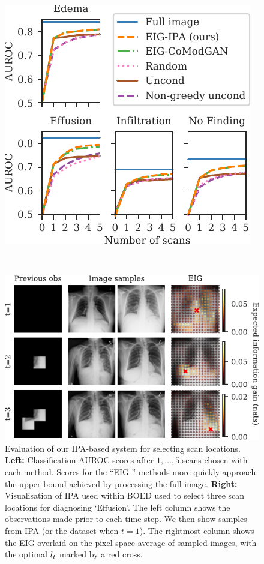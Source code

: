 \begin{figure}[t]
  \centering
  \hspace{-.75cm}
  \begin{minipage}{.4\textwidth}
    \centering
    \includegraphics[scale=.77]{figs/cigcvae/boed-auroc-curve-rearranged}
  \end{minipage}
  ~
  \begin{minipage}{0.54\textwidth}
    \centering
    \includegraphics[scale=.77]{figs/cigcvae/shrunk-boed-vis}
  \end{minipage}
  \caption{Evaluation of our IPA-based system for selecting scan locations. \textbf{Left:} Classification AUROC scores after $1,\ldots,5$ scans
    chosen with each method. Scores for the ``EIG-'' methods more quickly approach the
    upper bound achieved by processing the full image. \textbf{Right:}
    Visualisation of IPA used within BOED used to select three scan locations for diagnosing `Effusion'. The left column shows the observations made prior to each time step. We then show samples from IPA (or the dataset when $t=1$). The
    rightmost column shows the EIG overlaid on the pixel-space average of
    sampled images, with the optimal $l{}_t$ marked by a red cross.}
  \label{fig:cigcvae-boed}
  \vspace{-.4cm}
\end{figure}



